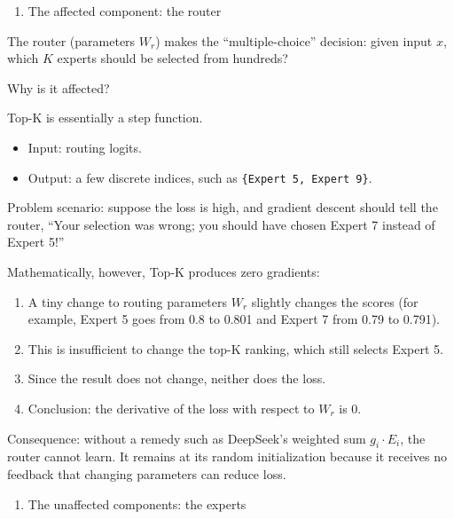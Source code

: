 \begin{enumerate}
\def\labelenumi{\arabic{enumi}.}
\tightlist
\item
  The affected component: the router
\end{enumerate}

The router (parameters \(W_r\)) makes the ``multiple-choice'' decision: given input \(x\), which \(K\) experts should be selected from hundreds?

Why is it affected?

Top-K is essentially a step function.

\begin{itemize}
\tightlist
\item
  Input: routing logits.
\item
  Output: a few discrete indices, such as \texttt{\{Expert\ 5,\ Expert\ 9\}}.
\end{itemize}

Problem scenario: suppose the loss is high, and gradient descent should tell the router, ``Your selection was wrong; you should have chosen Expert 7 instead of Expert 5!''

Mathematically, however, Top-K produces zero gradients:

\begin{enumerate}
\def\labelenumi{\arabic{enumi}.}
\tightlist
\item
  A tiny change to routing parameters \(W_r\) slightly changes the scores (for example, Expert 5 goes from 0.8 to 0.801 and Expert 7 from 0.79 to 0.791).
\item
  This is insufficient to change the top-K ranking, which still selects Expert 5.
\item
  Since the result does not change, neither does the loss.
\item
  Conclusion: the derivative of the loss with respect to \(W_r\) is 0.
\end{enumerate}

Consequence: without a remedy such as DeepSeek's weighted sum \(g_i \cdot E_i\), the router cannot learn. It remains at its random initialization because it receives no feedback that changing parameters can reduce loss.

\begin{enumerate}
\def\labelenumi{\arabic{enumi}.}
\setcounter{enumi}{1}
\tightlist
\item
  The unaffected components: the experts
\end{enumerate}

